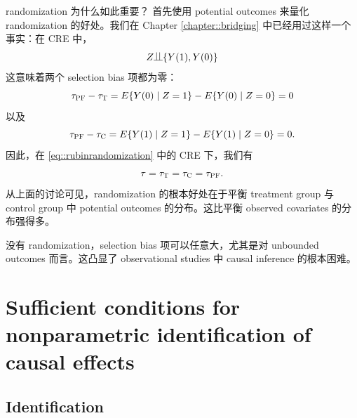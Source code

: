  
 
 
 randomization 为什么如此重要？\citet{rubin1978bayesian} 首先使用 potential outcomes 来量化 randomization 的好处。我们在 Chapter \ref{chapter::bridging} 中已经用过这样一个事实：在 CRE 中，
\begin{equation}\label{eq::rubinrandomization}
 Z  \ind \{ Y (1) , Y (0) \}
\end{equation}
这意味着两个 selection bias 项都为零：
 $$
  \tau_\textsc{PF} - \tau_\textsc{T}  = 
 E\{   Y(0)  \mid Z = 1 \} - E\{   Y(0)  \mid Z = 0 \}  = 0
 $$
以及
 $$
   \tau_\textsc{PF} - \tau_\textsc{C} =
 E\{   Y(1)  \mid Z = 1 \} - E\{   Y(1)  \mid Z = 0 \}  = 0. 
 $$
 因此，在 \eqref{eq::rubinrandomization} 中的 CRE 下，我们有 
\begin{equation}
\label{eq::no-selection-bias-all-equal}
 \tau = \tau_\textsc{T} = \tau_\textsc{C} = \tau_\textsc{PF}.
\end{equation}
从上面的讨论可见，randomization 的根本好处在于平衡 treatment group 与 control group 中 potential outcomes 的分布。这比平衡 observed covariates 的分布强得多。 
 

没有 randomization，selection bias 项可以任意大，尤其是对 unbounded outcomes 而言。这凸显了 observational studies 中 causal inference 的根本困难。 


\section{Sufficient conditions for nonparametric identification of causal effects} 
 
 
 
\subsection{Identification}\label{sec::identification-ignorability}
 
